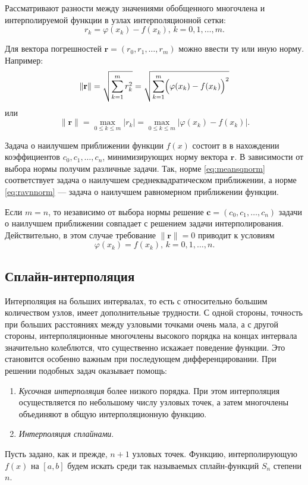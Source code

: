 Рассматривают разности между значениями обобщенного многочлена и интерполируемой
функции в узлах интерполяционной сетки:
\[
r_{k}=\varphi(x_{k})-f(x_{k}),\, k=0,1,\dots,m.
\]


Для вектора погрешностей $\mathbf{r}=\left(r_{0},r_{1},\dots,r_{m}\right)$
можно ввести ту или иную норму. Например:
\begin{equation}
\|\mathbf{r}\|=\sqrt{\sum_{k=1}^{m}r_{k}^{2}}=\sqrt{\sum_{k=1}^{m}\Bigl(\varphi(x_{k})-f(x_{k})\Bigr)^{2}}\label{eq:meansqnorm}
\end{equation}
или
\begin{equation}
\|\mathbf{r}\|=\max_{0\leqslant k\leqslant m}|r_{k}|=\max_{0\leqslant k\leqslant m}|\varphi(x_{k})-f(x_{k})|.\label{eq:ravnnorm}
\end{equation}


Задача о наилучшем приближении функции $f(x)$ состоит в в нахождении
коэффициентов $c_{0},c_{1},\dots,c_{n}$, минимизирующих норму вектора
$\mathbf{r}$. В зависимости от выбора нормы получим различные задачи.
Так, норме \eqref{eq:meansqnorm} соответствует задача о наилучшем
среднеквадратическом приближении, а норме \eqref{eq:ravnnorm} ---
задача о наилучшем равномерном приближении функции.

Если $m=n$, то независимо от выбора нормы решение $\mathbf{c}=(c_{0},c_{1},\dots,c_{n})$
задачи о наилучшем приближении совпадает с решением задачи интерполирования.
Действительно, в этом случае требование $\|\mathbf{r}\|=0$ приводит
к условиям 
\[
\varphi(x_{k})=f(x_{k}),\, k=0,1,\dots,n.
\]



\subsection{Сплайн-интерполяция}

Интерполяция на больших интервалах, то есть с относительно большим
количеством узлов, имеет дополнительные трудности. С одной стороны,
точность при больших расстояниях между узловыми точками очень мала,
а с другой стороны, интерполяционные многочлены высокого порядка на
концах интервала значительно колеблются, что существенно искажает
поведение функции. Это становится особенно важным при последующем
дифференцировании. При решении подобных задач оказывает помощь:
\begin{enumerate}
\item \emph{Кусочная интерполяция}
более низкого порядка. При этом интерполяция осуществляется по небольшому
числу узловых точек, а затем многочлены объединяют в общую интерполяционную
функцию.
\item \emph{Интерполяция сплайнами}.
\end{enumerate}
Пусть задано, как и прежде, $n+1$ узловых точек. Функцию, интерполирующую
$f(x)$ на $[a,b]$ будем искать среди так называемых сплайн-функций
$S_{n}$ степени $n$.


